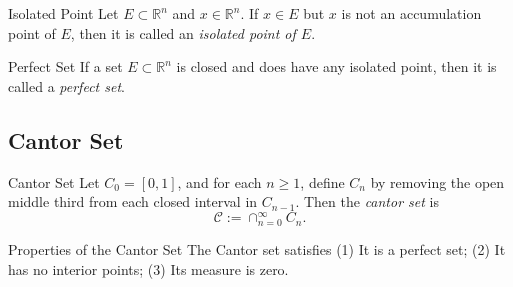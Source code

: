 \begin{definition}{Isolated Point}{}
  Let $E \subset \mathbb{R}^n$ and $x \in \mathbb{R}^n$.
  If $x \in E$ but $x$ is not an accumulation point of $E$,
  then it is called an \emph{isolated point of $E$}.
\end{definition}

\begin{definition}{Perfect Set}{}
  If a set $E \subset \mathbb{R}^n$ is closed and does have any isolated point,
  then it is called a \emph{perfect set}.
\end{definition}

\subsection{Cantor Set}

\begin{definition}{Cantor Set}{}
  Let $C_0 = [0, 1]$, and for each $n \geq 1$, define $C_n$ by removing the open
  middle third from each closed interval in $C_{n-1}$.
  Then the \emph{cantor set} is
  \begin{equation}
    \mathcal{C} := \cap _{n = 0}^{\infty}C_n.
  \end{equation}
\end{definition}

\begin{proposition}{Properties of the Cantor Set}{}
  The Cantor set satisfies
  (1) It is a perfect set;
  (2) It has no interior points;
  (3) Its measure is zero.
\end{proposition}


